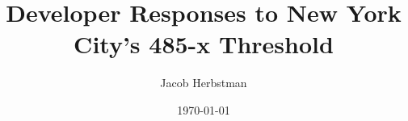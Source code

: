 \documentclass[12pt]{article}
\title{Developer Responses to New York City's 485-x Threshold}
\author{Jacob Herbstman}
\date{\today}
\begin{document}
\maketitle
\onehalfspacing




\end{document}
